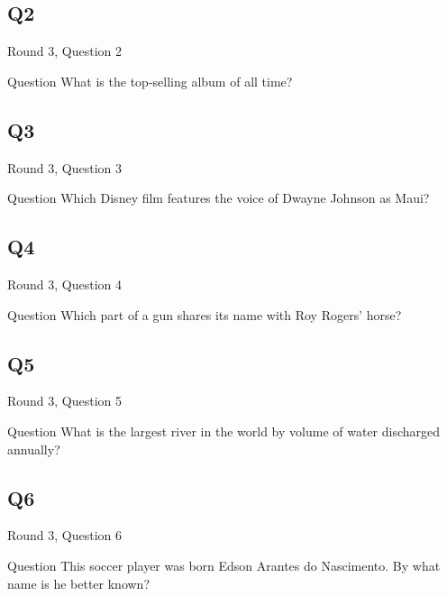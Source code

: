 \documentclass[11pt]{beamer}
\begin{document}
\subsection*{Q2}
\begin{frame}[t]{Round 3, Question 2}
\vspace{2em}
\begin{block}{Question}
What is the top-selling album of all time\@?
\end{block}
\end{frame}
    

\subsection*{Q3}
\begin{frame}[t]{Round 3, Question 3}
\vspace{2em}
\begin{block}{Question}
Which Disney film features the voice of Dwayne Johnson as Maui\@?
\end{block}
\end{frame}
    

\subsection*{Q4}
\begin{frame}[t]{Round 3, Question 4}
\vspace{2em}
\begin{block}{Question}
Which part of a gun shares its name with Roy Rogers' horse\@?
\end{block}
\end{frame}
    

\subsection*{Q5}
\begin{frame}[t]{Round 3, Question 5}
\vspace{2em}
\begin{block}{Question}
What is the largest river in the world by volume of water discharged annually\@?
\end{block}
\end{frame}
    

\subsection*{Q6}
\begin{frame}[t]{Round 3, Question 6}
\vspace{2em}
\begin{block}{Question}
This soccer player was born Edson Arantes do Nascimento. By what name is he better known\@?
\end{block}
\end{frame}
    
\end{document}
